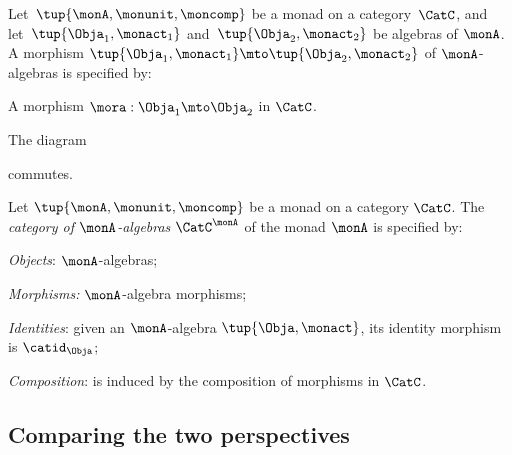 \begin{ctdefinition}
    \label{def:algebramorphism}
Let~$\tup{\monA, \monunit, \moncomp}$ be a monad on a category~$\CatC$, and let~$\tup{\Obja_1, \monact_1}$ and~$\tup{\Obja_2, \monact_2}$ be algebras of $\monA$. A morphism $\tup{\Obja_1, \monact_1} \mto \tup{\Obja_2, \monact_2}$ of $\monA$-algebras is specified by: \

\constit
\begin{compactenum}
\item A morphism $\mora : \Obja_1 \mto \Obja_2$ in $\CatC$.
\end{compactenum}
\condit
\begin{compactenum}
\item The diagram
\begin{center}
  \end{center}
commutes.
\end{compactenum}
\end{ctdefinition}



\begin{ctdefinition}
    \label{def:catofmonadalgebras}
Let $\tup{\monA, \monunit, \moncomp}$ be a monad on a category $\CatC$. The \emph{category of $\monA$-algebras} $\CatC^\monA$ of the monad $\monA$ is specified by:
\begin{compactenum}
\item \emph{Objects}: $\monA$-algebras;
\item \emph{Morphisms:} $\monA$-algebra morphisms;
\item \emph{Identities}: given an $\monA$-algebra $\tup{\Obja, \monact}$, its identity morphism is $\catid_\Obja$;
\item \emph{Composition}: is induced by the composition of morphisms in $\CatC$.
\end{compactenum}
\end{ctdefinition}

\subsection{Comparing the two perspectives}


